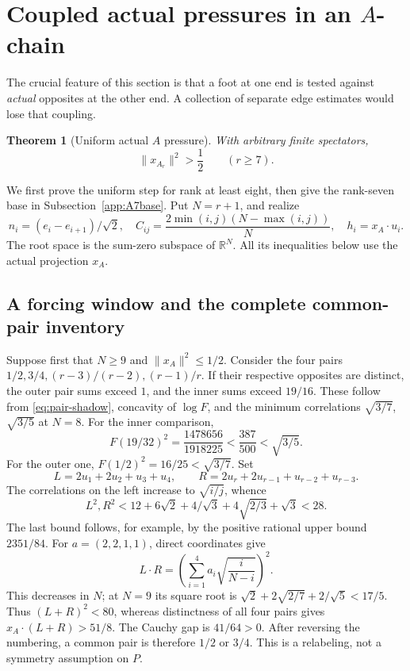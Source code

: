 \documentclass[11pt]{article}
\newtheorem{theorem}{Theorem}[section]
\theoremstyle{definition}
\theoremstyle{remark}
\newcommand{\R}{\mathbb R}
\begin{document}
\section[Coupled actual pressures in an A-chain]{Coupled actual pressures in an \(A\)-chain}\label{app:Achain}

The crucial feature of this section is that a foot at one end is
tested against \emph{actual} opposites at the other end. A collection
of separate edge estimates would lose that coupling.

\begin{theorem}[Uniform actual \(A\) pressure]\label{app:thm:Ahalf}
With arbitrary finite spectators,
\[
 \|x_{A_r}\|^2>\frac12\qquad(r\ge7).
\]
\end{theorem}

We first prove the uniform step for rank at least eight, then give the
rank-seven base in Subsection~\ref{app:A7base}. Put \(N=r+1\), and realize
\[
 n_i=(e_i-e_{i+1})/\sqrt2,\quad
 C_{ij}=\frac{2\min(i,j)(N-\max(i,j))}{N},\quad
 h_i=x_A\cdot u_i .
\]
The root space is the sum-zero subspace of \(\R^N\). All its
inequalities below use the actual projection \(x_A\).

\subsection{A forcing window and the complete common-pair inventory}

Suppose first that \(N\ge9\) and \(\|x_A\|^2\le1/2\). Consider the
four pairs \(1/2,3/4,(r-3)/(r-2),(r-1)/r\).
If their respective opposites are distinct, the outer pair sums
exceed \(1\), and the inner sums exceed \(19/16\). These follow
from \eqref{eq:pair-shadow}, concavity of \(\log F\), and the minimum
correlations \(\sqrt{3/7}\), \(\sqrt{3/5}\) at \(N=8\).
For the inner comparison,
\[
 F(19/32)^2=\frac{1478656}{1918225}
 <\frac{387}{500}<\sqrt{3/5}.
\]
For the outer one, \(F(1/2)^2=16/25<\sqrt{3/7}\).
Set
\[
 L=2u_1+2u_2+u_3+u_4,\qquad
 R=2u_r+2u_{r-1}+u_{r-2}+u_{r-3}.
\]
The correlations on the left increase to \(\sqrt{i/j}\), whence
\[
 L^2,R^2<
 12+6\sqrt2+4/\sqrt3+4\sqrt{2/3}+\sqrt3<28.
\]
The last bound follows, for example, by the positive rational
upper bound \(2351/84\). For \(a=(2,2,1,1)\), direct coordinates give
\[
 L\cdot R=\left(\sum_{i=1}^4a_i\sqrt{\frac{i}{N-i}}\right)^2.
\]
This decreases in \(N\); at \(N=9\) its square root is
\(\sqrt2+2\sqrt{2/7}+2/\sqrt5<17/5\).
Thus \((L+R)^2<80\), whereas distinctness of all four pairs gives
\(x_A\cdot(L+R)>51/8\). The Cauchy gap is \(41/64>0\).
After reversing the numbering, a common pair is therefore \(1/2\)
or \(3/4\). This is a relabeling, not a symmetry assumption on \(P\).
\end{document}

